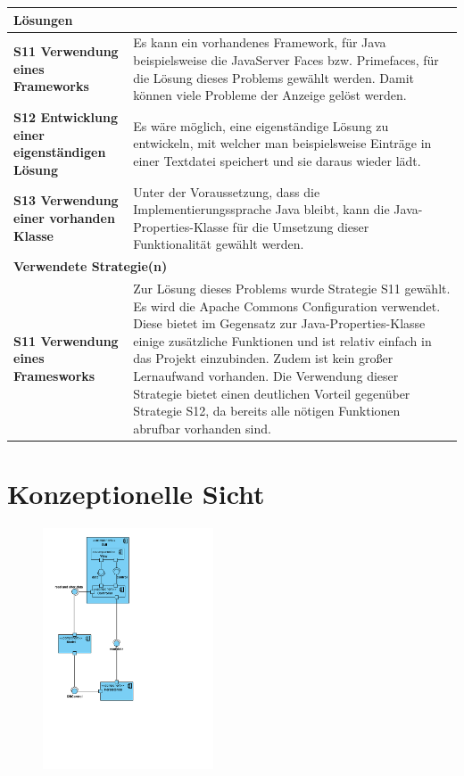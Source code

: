 \documentclass[fontsize=12pt,paper=a4,twoside]{scrartcl}
\begin{document}
\begin{tabularx}{\textwidth}{|p{6cm}|X|}
\hline
\multicolumn{2}{|l|}{\textbf{Lösungen}} \\\hline
\textbf{S11 Verwendung eines Frameworks} & Es kann ein vorhandenes Framework, für Java beispielsweise die JavaServer Faces bzw. Primefaces, für die Lösung dieses Problems gewählt werden. Damit können viele Probleme der Anzeige gelöst werden.\\\hline
\textbf{S12 Entwicklung einer eigenständigen Lösung} & Es wäre möglich, eine eigenständige Lösung zu entwickeln, mit welcher man beispielsweise Einträge in einer Textdatei speichert und sie daraus wieder lädt. \\
\textbf{S13 Verwendung einer vorhanden Klasse} & Unter der Voraussetzung, dass die Implementierungssprache Java bleibt, kann die Java-Properties-Klasse für die Umsetzung dieser Funktionalität gewählt werden. \\\hline
\multicolumn{2}{|l|}{\textbf{Verwendete Strategie(n)}} \\\hline
\textbf{S11 Verwendung eines Framesworks} & Zur Lösung dieses Problems wurde Strategie S11 gewählt. Es wird die Apache Commons Configuration verwendet. Diese bietet im Gegensatz zur Java-Properties-Klasse einige zusätzliche Funktionen und ist relativ einfach in das Projekt einzubinden. Zudem ist kein großer Lernaufwand vorhanden. Die Verwendung dieser Strategie bietet einen deutlichen Vorteil gegenüber Strategie S12, da bereits alle nötigen Funktionen abrufbar vorhanden sind.\\\hline
\end{tabularx}
\newpage


\section{Konzeptionelle Sicht}
\label{sec:konzeptionell}

\begin{figure}[H]
\centering
\includegraphics[width=0.45\textwidth]{konzeptsicht.pdf}
\end{figure}
\end{document}
